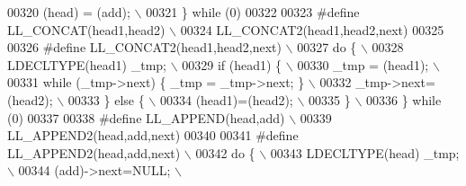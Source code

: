 \begin{DoxyCode}
00320 \textcolor{preprocessor}{  (head) = (add);                                                                              \(\backslash\)}
00321 \textcolor{preprocessor}{\} while (0)}
00322 
00323 \textcolor{preprocessor}{#define LL\_CONCAT(head1,head2)                                                                 \(\backslash\)}
00324 \textcolor{preprocessor}{    LL\_CONCAT2(head1,head2,next)}
00325 
00326 \textcolor{preprocessor}{#define LL\_CONCAT2(head1,head2,next)                                                           \(\backslash\)}
00327 \textcolor{preprocessor}{do \{                                                                                           \(\backslash\)}
00328 \textcolor{preprocessor}{  LDECLTYPE(head1) \_tmp;                                                                       \(\backslash\)}
00329 \textcolor{preprocessor}{  if (head1) \{                                                                                 \(\backslash\)}
00330 \textcolor{preprocessor}{    \_tmp = (head1);                                                                            \(\backslash\)}
00331 \textcolor{preprocessor}{    while (\_tmp->next) \{ \_tmp = \_tmp->next; \}                                                  \(\backslash\)}
00332 \textcolor{preprocessor}{    \_tmp->next=(head2);                                                                        \(\backslash\)}
00333 \textcolor{preprocessor}{  \} else \{                                                                                     \(\backslash\)}
00334 \textcolor{preprocessor}{    (head1)=(head2);                                                                           \(\backslash\)}
00335 \textcolor{preprocessor}{  \}                                                                                            \(\backslash\)}
00336 \textcolor{preprocessor}{\} while (0)}
00337 
00338 \textcolor{preprocessor}{#define LL\_APPEND(head,add)                                                                    \(\backslash\)}
00339 \textcolor{preprocessor}{    LL\_APPEND2(head,add,next)}
00340 
00341 \textcolor{preprocessor}{#define LL\_APPEND2(head,add,next)                                                              \(\backslash\)}
00342 \textcolor{preprocessor}{do \{                                                                                           \(\backslash\)}
00343 \textcolor{preprocessor}{  LDECLTYPE(head) \_tmp;                                                                        \(\backslash\)}
00344 \textcolor{preprocessor}{  (add)->next=NULL;                                                                            \(\backslash\)}

\end{DoxyCode}
